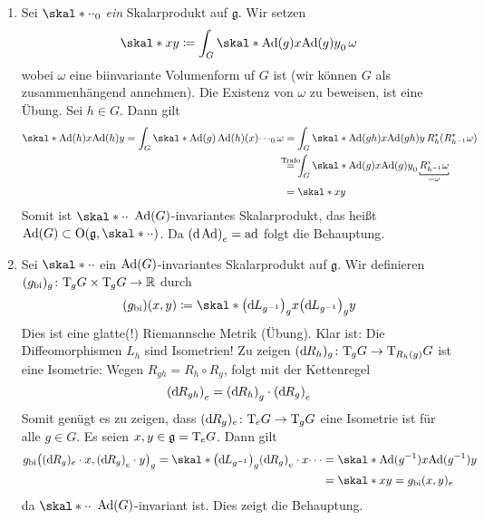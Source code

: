 \begin{beweis}
	\begin{enumerate}[1)]
		\item Sei $\skal*{\cdot}{\cdot}_0$ \emph{ein} Skalarprodukt auf $\mathfrak{g}$.
		Wir setzen 
		\[
			\skal*{x}{y} \coloneqq \int_G \skal*{\Ad(g)x}{\Ad(g)y}_0 \,\omega
		\]
		wobei $\omega$ eine biinvariante Volumenform uf $G$ ist (wir können $G$ als zusammenhängend annehmen). 
		Die Existenz von $\omega$ zu beweisen, ist eine Übung.
		Sei $h \in G$.
		Dann gilt 
		\begin{align}
			\skal*{\Ad(h) x}{\Ad(h)y} = \int_G \skal*{\Ad(g) \Ad(h)(x)}{ \cdots}_0 \, \omega &= \int_G \skal*{\Ad(gh)x}{\Ad(gh)y} \, R_h^* \enbrace*{R^*_{h^{-1}} \omega} \\
			&\StackTextClap{Trafo}{=} \int_G \skal*{\Ad(g) x}{ \Ad(g)y}_0 \, \Underbracket{R^*_{h^{-1}} \omega}{=\omega} \\
			&= \skal*{x}{y}
		\end{align}
		Somit ist $\skal*{\cdot}{\cdot}$ $\Ad(G)$-invariantes Skalarprodukt, das heißt $\Ad(G) \subset \On(\mathfrak{g},\skal*{\cdot}{\cdot})$.
		Da $\enbrace*{\mathd \Ad}_e = \ad$ folgt die Behauptung.
		\item Sei $\skal*{\cdot}{\cdot}$ ein $\Ad(G)$-invariantes Skalarprodukt auf $\mathfrak{g}$.
		Wir definieren $(g_\bi)_g \colon \Tmap_g G \times \Tmap_g G \to \mathbb{R}$ durch
		\[
			(g_\bi)(x,y) \coloneqq \skal*{\enbrace*{\mathd L_{g^{-1}}}_g x}{ \enbrace*{\mathd L_{g^{-1}}}_gy}
		\]
		Dies ist eine glatte(!) Riemannsche Metrik (Übung).
		Klar ist: Die Diffeomorphismen $L_h$ sind Isometrien!
		Zu zeigen $(\mathd R_h)_g \colon \Tmap_g G \to \Tmap_{R_h(g)} G $ ist eine Isometrie:
		Wegen $R_{gh} = R_h \circ R_g$, folgt mit der Kettenregel
		\[
			\enbrace*{\mathd R_{gh}}_e = \enbrace*{\mathd R_h}_g \cdot \enbrace*{\mathd R_g}_e
		\]
		Somit genügt es zu zeigen, dass $(\mathd R_g)_e \colon \Tmap_e G \to \Tmap_g G$ eine Isometrie ist für alle $g \in G$.
		Es seien $x,y \in \mathfrak{g} = \Tmap_e G$.
		Dann gilt
		\begin{align}
			g_\bi \enbrace*{(\mathd R_g)_e \cdot x, \enbrace*{\mathd R_g}_e \cdot y}_g = \skal*{ \enbrace*{\mathd L_{g^{-1}}}_g \enbrace*{\mathd R_g}_e \cdot x}{\cdots}
			&= \skal*{\Ad(g^{-1}) x}{ \Ad(g^{-1})y} \\
			&= \skal*{x}{y} = g_\bi(x,y)_e
		\end{align}
		da $\skal*{\cdot }{\cdot}$ $\Ad(G)$-invariant ist.
		Dies zeigt die Behauptung.\qedhere
	\end{enumerate}
\end{beweis}

